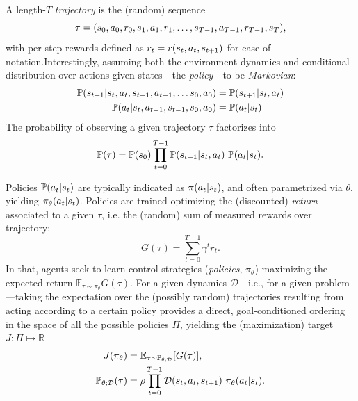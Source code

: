 A length-\(T\) \emph{trajectory} is the (random) sequence
\begin{equation}\label{eq:trajectory_definition}
    \tau = (s_0, a_0, r_0, s_1, a_1, r_1, \dots, s_{T-1}, a_{T-1}, r_{T-1}, s_T),
\end{equation}
with per-step rewards defined as \(r_t = r (s_t, a_t, s_{t+1}) \) for ease of notation.Interestingly, assuming both the environment dynamics and conditional distribution over actions given states---the \emph{policy}---to be \emph{Markovian}:
%
\begin{align}
\mathbb P(s_{t+1} \vert s_t, a_t, s_{t-1}, a_{t-1}, \dots s_0, a_0 ) &= \mathbb P (s_{t+1} \vert s_t, a_t) \label{eq:dynamics_markovian} \\
\mathbb P(a_t \vert s_t, a_{t-1}, s_{t-1}, s_0, a_0) &= \mathbb P(a_t \vert s_t) \label{eq:policy_markovian}
\end{align}
%
The probability of observing a given trajectory \( \tau \) factorizes into
\begin{equation}\label{eq:traj_prob}
    \mathbb P(\tau) = \mathbb P (s_0) \prod_{t=0}^{T-1} \mathbb P (s_{t+1} \vert s_t, a_t) \ \mathbb P(a_t \vert s_t).
\end{equation}

Policies \( \mathbb P(a_t \vert s_t) \) are typically indicated as \( \pi(a_t \vert s_t) \), and often parametrized via \( \theta \), yielding \( \pi_\theta (a_t \vert s_t )\).
Policies are trained optimizing the (discounted) \emph{return} associated to a given \( \tau \), i.e. the (random) sum of measured rewards over trajectory:
\[
    G(\tau) = \sum_{t=0}^{T-1} \gamma^{t} r_t.
\]
In that, agents seek to learn control strategies (\emph{policies}, \( \pi_\theta \)) maximizing the expected return \( \mathbb E_{\tau \sim \pi_\theta} G(\tau) \). 
For a given dynamics \( \mathcal D \)---i.e., for a given problem---taking the expectation over the (possibly random) trajectories resulting from acting according to a certain policy provides a direct, goal-conditioned ordering in the space of all the possible policies \( \Pi \), yielding the (maximization) target \( J : \Pi \mapsto \mathbb R \)
\begin{align}
    J(\pi_\theta) &= \mathbb E_{\tau \sim \mathbb P_{\theta; \mathcal D}} \left[ G(\tau) \right], \label{eq:RL-j-function} \\
    \mathbb P_{\theta; \mathcal D} (\tau) &= \rho \prod_{t=0}^{T-1} \mathcal D \transition \ \pi_\theta (\action \vert \state).\label{eq:traj-probabilities-for-policies}
\end{align}

